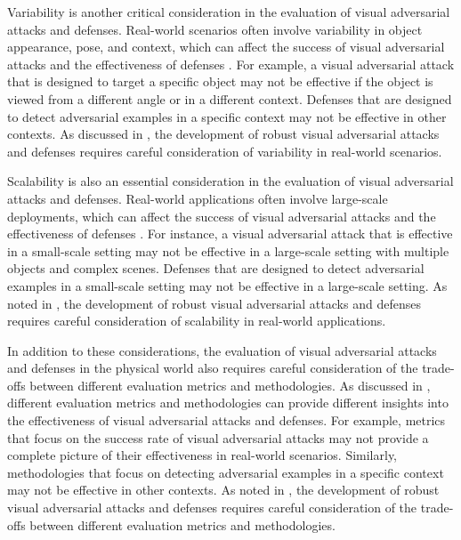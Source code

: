 \documentclass[11pt,a4paper]{article}
\begin{document}
Variability is another critical consideration in the evaluation of visual adversarial attacks and defenses. Real-world scenarios often involve variability in object appearance, pose, and context, which can affect the success of visual adversarial attacks and the effectiveness of defenses \cite{doi:10.3390/cancers15174228}. For example, a visual adversarial attack that is designed to target a specific object may not be effective if the object is viewed from a different angle or in a different context. Defenses that are designed to detect adversarial examples in a specific context may not be effective in other contexts. As discussed in \cite{doi:10.1016/j.eng.2019.12.012}, the development of robust visual adversarial attacks and defenses requires careful consideration of variability in real-world scenarios.

Scalability is also an essential consideration in the evaluation of visual adversarial attacks and defenses. Real-world applications often involve large-scale deployments, which can affect the success of visual adversarial attacks and the effectiveness of defenses \cite{doi:10.1109/access.2022.3208131}. For instance, a visual adversarial attack that is effective in a small-scale setting may not be effective in a large-scale setting with multiple objects and complex scenes. Defenses that are designed to detect adversarial examples in a small-scale setting may not be effective in a large-scale setting. As noted in \cite{doi:10.1007/s11263-023-01934-3}, the development of robust visual adversarial attacks and defenses requires careful consideration of scalability in real-world applications.

In addition to these considerations, the evaluation of visual adversarial attacks and defenses in the physical world also requires careful consideration of the trade-offs between different evaluation metrics and methodologies. As discussed in \cite{doi:10.3390/bdcc8010008}, different evaluation metrics and methodologies can provide different insights into the effectiveness of visual adversarial attacks and defenses. For example, metrics that focus on the success rate of visual adversarial attacks may not provide a complete picture of their effectiveness in real-world scenarios. Similarly, methodologies that focus on detecting adversarial examples in a specific context may not be effective in other contexts. As noted in \cite{doi:10.1145/3702638}, the development of robust visual adversarial attacks and defenses requires careful consideration of the trade-offs between different evaluation metrics and methodologies.
\end{document}

